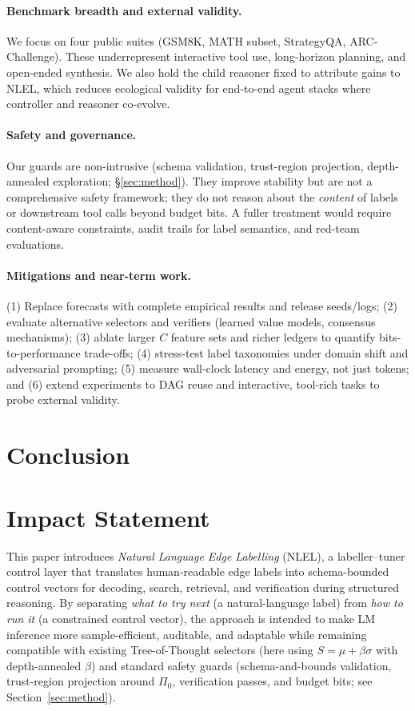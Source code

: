 \documentclass{article}
\theoremstyle{plain}
\theoremstyle{definition}
\theoremstyle{remark}
\begin{document}
\paragraph{Benchmark breadth and external validity.}
We focus on four public suites (GSM8K, MATH subset, StrategyQA, ARC-Challenge). These underrepresent interactive tool use, long-horizon planning, and open-ended synthesis. We also hold the child reasoner fixed to attribute gains to NLEL, which reduces ecological validity for end-to-end agent stacks where controller and reasoner co-evolve.

\paragraph{Safety and governance.}
Our guards are non-intrusive (schema validation, trust-region projection, depth-annealed exploration; \S\ref{sec:method}). They improve stability but are not a comprehensive safety framework; they do not reason about the \emph{content} of labels or downstream tool calls beyond budget bits. A fuller treatment would require content-aware constraints, audit trails for label semantics, and red-team evaluations.

\paragraph{Mitigations and near-term work.}
(1) Replace forecasts with complete empirical results and release seeds/logs;
(2) evaluate alternative selectors and verifiers (learned value models, consensus mechanisms);
(3) ablate larger $C$ feature sets and richer ledgers to quantify bits-to-performance trade-offs;
(4) stress-test label taxonomies under domain shift and adversarial prompting;
(5) measure wall-clock latency and energy, not just tokens; and
(6) extend experiments to DAG reuse and interactive, tool-rich tasks to probe external validity.
\section{Conclusion}

\section*{Impact Statement}

This paper introduces \emph{Natural Language Edge Labelling} (NLEL), a
labeller--tuner control layer that translates human-readable edge labels
into schema-bounded control vectors for decoding, search, retrieval, and
verification during structured reasoning. By separating \emph{what to try next}
(a natural-language label) from \emph{how to run it} (a constrained control vector),
the approach is intended to make LM inference more sample-efficient,
auditable, and adaptable while remaining compatible with existing
Tree-of-Thought selectors (here using $S=\mu+\beta\sigma$ with depth-annealed
$\beta$) and standard safety guards (schema-and-bounds validation,
trust-region projection around $\Pi_0$, verification passes, and budget bits;
see Section~\ref{sec:method}).
\end{document}
